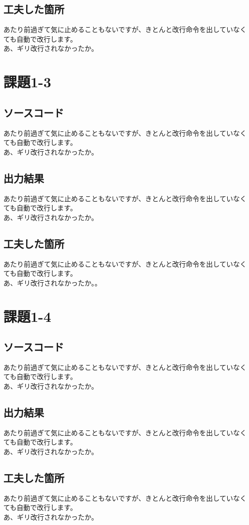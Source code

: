 \documentclass{ltjsarticle}
\begin{document}
\subsection*{工夫した箇所}
あたり前過ぎて気に止めることもないですが、きとんと改行命令を出していなくても自動で改行します。
\\あ、ギリ改行されなかったか。

\section*{課題1-3}
\subsection*{ソースコード}
あたり前過ぎて気に止めることもないですが、きとんと改行命令を出していなくても自動で改行します。
\\あ、ギリ改行されなかったか。

\subsection*{出力結果}
あたり前過ぎて気に止めることもないですが、きとんと改行命令を出していなくても自動で改行します。
\\あ、ギリ改行されなかったか。

\subsection*{工夫した箇所}
あたり前過ぎて気に止めることもないですが、きとんと改行命令を出していなくても自動で改行します。
\\あ、ギリ改行されなかったか。。

\section*{課題1-4}
\subsection*{ソースコード}
あたり前過ぎて気に止めることもないですが、きとんと改行命令を出していなくても自動で改行します。
\\あ、ギリ改行されなかったか。

\subsection*{出力結果}
あたり前過ぎて気に止めることもないですが、きとんと改行命令を出していなくても自動で改行します。
\\あ、ギリ改行されなかったか。

\subsection*{工夫した箇所}
あたり前過ぎて気に止めることもないですが、きとんと改行命令を出していなくても自動で改行します。
\\あ、ギリ改行されなかったか。
\end{document}
